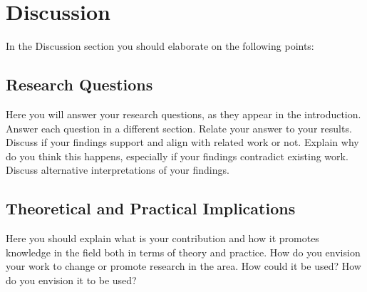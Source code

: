 \chapter{Discussion}
\label{sec:Discussion}

In the Discussion section you should elaborate on the following points:
\section{Research Questions}
Here you will answer your research questions, as they appear in the introduction. Answer each question in a different section. Relate your answer to your results.
Discuss if your findings support and align with related work or not. Explain why do you think this happens, especially if your findings contradict existing work.
Discuss alternative interpretations of your findings.

\section{Theoretical and Practical Implications}
Here you should explain what is your contribution and how it promotes knowledge in the field both in terms of theory and practice.
How do you envision your work to change or promote research in the area. How could it be used? How do you envision it to be used?


